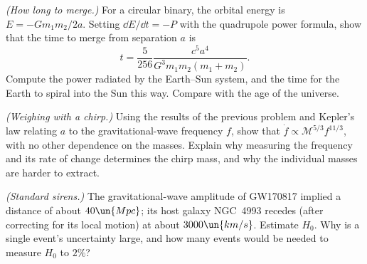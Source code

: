 \begin{problems}
\core \label{prob:inspiral} \emph{(How long to merge.)} For a circular binary, the orbital energy is $E = -Gm_1m_2/2a$. Setting $\dd E/\dd t = -P$ with the quadrupole power formula, show that the time to merge from separation $a$ is
\[
  t = \frac{5}{256}\frac{c^5a^4}{G^3m_1m_2(m_1+m_2)} .
\]
Compute the power radiated by the Earth--Sun system, and the time for the Earth to spiral into the Sun this way. Compare with the age of the universe.

 \label{prob:chirp} \emph{(Weighing with a chirp.)} Using the results of the previous problem and Kepler's law relating $a$ to the gravitational-wave frequency $f$, show that $\dot f\propto\mathcal M^{5/3}f^{11/3}$, with no other dependence on the masses. Explain why measuring the frequency and its rate of change determines the chirp mass, and why the individual masses are harder to extract.

 \label{prob:siren} \emph{(Standard sirens.)} The gravitational-wave amplitude of GW170817 implied a distance of about $40\un{Mpc}$; its host galaxy NGC~4993 recedes (after correcting for its local motion) at about $3000\un{km/s}$. Estimate $H_0$. Why is a single event's uncertainty large, and how many events would be needed to measure $H_0$ to $2\%$?
\end{problems}

\begin{reading}
\end{reading}
